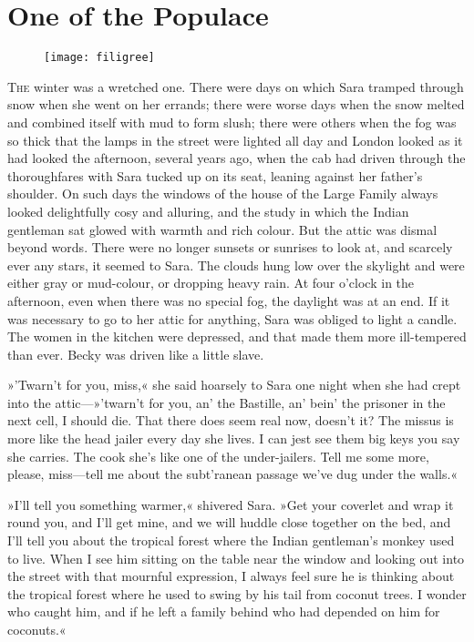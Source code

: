 \chapter{One of the Populace}

\begin{figure}[t!]
\centering
\texttt{[image: filigree]}
\end{figure}

\lettrine[lines=5]{T}{he} winter was a wretched one. There were days on which Sara tramped through snow when she went on her errands; there were worse days when the snow melted and combined itself with mud to form slush; there were others when the fog was so thick that the lamps in the street were lighted all day and London looked as it had looked the afternoon, several years ago, when the cab had driven through the thoroughfares with Sara tucked up on its seat, leaning against her father's shoulder. On such days the windows of the house of the Large Family always looked delightfully cosy and alluring, and the study in which the Indian gentleman sat glowed with warmth and rich colour. But the attic was dismal beyond words. There were no longer sunsets or sunrises to look at, and scarcely ever any stars, it seemed to Sara. The clouds hung low over the skylight and were either gray or mud-colour, or dropping heavy rain. At four o'clock in the afternoon, even when there was no special fog, the daylight was at an end. If it was necessary to go to her attic for anything, Sara was obliged to light a candle. The women in the kitchen were depressed, and that made them more ill-tempered than ever. Becky was driven like a little slave.

»'Twarn't for you, miss,« she said hoarsely to Sara one night when she had crept into the attic—»'twarn't for you, an' the Bastille, an' bein' the prisoner in the next cell, I should die. That there does seem real now, doesn't it? The missus is more like the head jailer every day she lives. I can jest see them big keys you say she carries. The cook she's like one of the under-jailers. Tell me some more, please, miss—tell me about the subt'ranean passage we've dug under the walls.«

»I'll tell you something warmer,« shivered Sara. »Get your coverlet and wrap it round you, and I'll get mine, and we will huddle close together on the bed, and I'll tell you about the tropical forest where the Indian gentleman's monkey used to live. When I see him sitting on the table near the window and looking out into the street with that mournful expression, I always feel sure he is thinking about the tropical forest where he used to swing by his tail from coconut trees. I wonder who caught him, and if he left a family behind who had depended on him for coconuts.«


